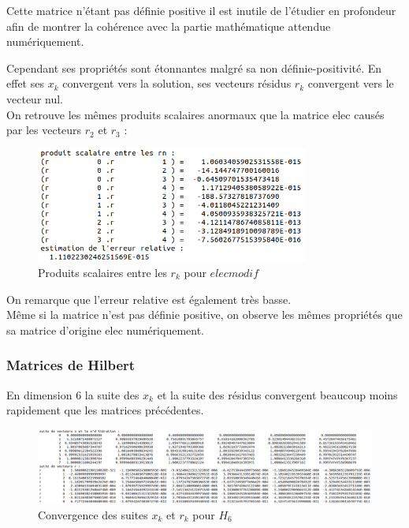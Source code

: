 \documentclass[12,french]{report}
\begin{document}
Cette matrice n'étant pas définie positive il est inutile de l'étudier en profondeur afin de montrer la cohérence avec la partie mathématique attendue numériquement.

Cependant ses propriétés sont étonnantes malgré sa non définie-positivité. En effet ses $x_{k}$ convergent vers la solution, ses vecteurs résidus $r_{k}$ convergent vers le vecteur nul.\\

On retrouve les mêmes produits scalaires anormaux que la matrice elec causés par les vecteurs $r_{2}$ et $r_{3}$ :

\begin{figure}[H]
	\centering
	\includegraphics[width=0.8\textwidth]{./Images/ps_elecmodif}
	\caption{Produits scalaires entre les $r_{k}$ pour $elecmodif$}
\end{figure}\vspace{0.2cm}

On remarque que l'erreur relative est également très basse.\\

Même si la matrice n'est pas définie positive, on observe les mêmes propriétés que sa matrice d'origine elec numériquement.

\subsubsection{Matrices de Hilbert}

En dimension 6 la suite des $x_{k}$ et la suite des résidus convergent beaucoup moins rapidement que les matrices précédentes.

\begin{figure}[H]
	\centering
	\includegraphics[width=1\textwidth]{./Images/xr_H_6}
	\caption{Convergence des suites $x_{k}$ et $r_{k}$ pour $H_{6}$}
\end{figure}\vspace{0.2cm}
\end{document}
